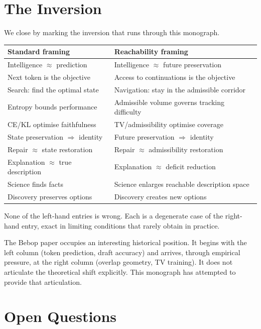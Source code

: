 \documentclass[11pt, a4paper, openany]{book}
\theoremstyle{plain}
\theoremstyle{definition}
\theoremstyle{remark}
\begin{document}
\section{The Inversion}

We close by marking the inversion that runs through this monograph.

\begin{center}
\begin{tabular}{ll}
\hline
\textbf{Standard framing} & \textbf{Reachability framing} \\
\hline
Intelligence $\approx$ prediction & Intelligence $\approx$ future preservation \\
Next token is the objective & Access to continuations is the objective \\
Search: find the optimal state & Navigation: stay in the admissible corridor \\
Entropy bounds performance & Admissible volume governs tracking difficulty \\
CE/KL optimise faithfulness & TV/admissibility optimise coverage \\
State preservation $\Rightarrow$ identity & Future preservation $\Rightarrow$ identity \\
Repair $\approx$ state restoration & Repair $\approx$ admissibility restoration \\
Explanation $\approx$ true description & Explanation $\approx$ deficit reduction \\
Science finds facts & Science enlarges reachable description space \\
Discovery preserves options & Discovery creates new options \\
\hline
\end{tabular}
\end{center}

None of the left-hand entries is wrong.
Each is a degenerate case of the right-hand entry, exact in limiting conditions
that rarely obtain in practice.

The Bebop paper occupies an interesting historical position.
It begins with the left column (token prediction, draft accuracy) and
arrives, through empirical pressure, at the right column (overlap geometry,
TV training).
It does not articulate the theoretical shift explicitly.
This monograph has attempted to provide that articulation.

\section{Open Questions}
\end{document}
